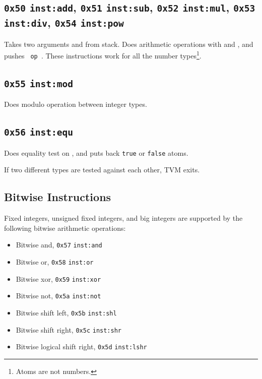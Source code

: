\documentclass{report}
\newcommand{\inst}[1] {\texttt{inst:#1}}
\begin{document}
\subsection{\texttt{0x50} \inst{add}, \texttt{0x51} \inst{sub}, \texttt{0x52} \inst{mul}, \texttt{0x53} \inst{div}, \texttt{0x54} \inst{pow}}

Takes two arguments  and  from stack. Does arithmetic operations with  and , and pushes \texttt{ op }. These instructions work for all the number types\footnote{Atoms are not numbers.}.

\subsection{\texttt{0x55} \inst{mod}  }

Does modulo operation between integer types.

\subsection{\texttt{0x56} \inst{equ}  }

Does equality test on  , and puts back \texttt{true} or \texttt{false} atoms.

\begin{mdframed}[style=hint]
  If two different types are tested against each other, TVM exits.
\end{mdframed}

\subsection{Bitwise Instructions}

Fixed integers, unsigned fixed integers, and big integers are supported by the following bitwise arithmetic operations:
\begin{itemize}
\item Bitwise and, \texttt{0x57} \inst{and}  
\item Bitwise or, \texttt{0x58} \inst{or}  
\item Bitwise xor, \texttt{0x59} \inst{xor}  
\item Bitwise not, \texttt{0x5a} \inst{not} 
\item Bitwise shift left, \texttt{0x5b} \inst{shl}  
\item Bitwise shift right, \texttt{0x5c} \inst{shr}  
\item Bitwise logical shift right, \texttt{0x5d} \inst{lshr}  
\end{itemize}
\end{document}
